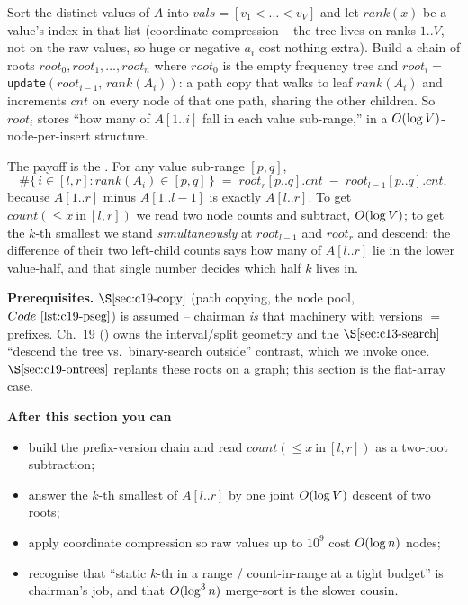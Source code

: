 \begin{topicintro}
Sort the distinct values of \(A\) into \(\mathit{vals}=[v_1<\dots<v_V]\) and let \(\mathit{rank}(x)\) be a value's index in that list (coordinate compression -- the tree lives on ranks \(1..V\), not on the raw values, so huge or negative \(a_i\) cost nothing extra). Build a chain of roots \(\mathit{root}_0,\mathit{root}_1,\dots,\mathit{root}_n\) where \(\mathit{root}_0\) is the empty frequency tree and \(\mathit{root}_i=\) \texttt{update}\((\mathit{root}_{i-1},\,\mathit{rank}(A_i))\): a path copy that walks to leaf \(\mathit{rank}(A_i)\) and increments \(\mathit{cnt}\) on every node of that one path, sharing the other children. So \(\mathit{root}_i\) stores ``how many of \(A[1..i]\) fall in each value sub-range,'' in a \(O(\log V)\)-node-per-insert structure.

The payoff is the . For any value sub-range \([p,q]\),
\[
  \#\{\,i\in[l,r]: \mathit{rank}(A_i)\in[p,q]\,\}
  \;=\; \mathit{root}_r[p..q].\mathit{cnt} \;-\; \mathit{root}_{l-1}[p..q].\mathit{cnt},
\]
because \(A[1..r]\) minus \(A[1..l-1]\) is exactly \(A[l..r]\). To get \(\mathit{count}(\le x\ \text{in}\ [l,r])\) we read two node counts and subtract, \(O(\log V)\); to get the \(k\)-th smallest we stand \emph{simultaneously} at \(\mathit{root}_{l-1}\) and \(\mathit{root}_r\) and descend: the difference of their two left-child counts says how many of \(A[l..r]\) lie in the lower value-half, and that single number decides which half \(k\) lives in.

\textbf{Prerequisites.} \(\secref{c19-copy}\) (path copying, the node pool, \(\coderef{c19-pseg}\)) is assumed -- chairman \emph{is} that machinery with versions \(=\) prefixes. Ch.~19 () owns the interval/split geometry and the \(\secref{c13-search}\) ``descend the tree vs.\ binary-search outside'' contrast, which we invoke once. \(\secref{c19-ontrees}\) replants these roots on a graph; this section is the flat-array case.

\textbf{After this section you can}
\begin{itemize}[nosep]
  \item build the prefix-version chain and read \(\mathit{count}(\le x\ \text{in}\ [l,r])\) as a two-root subtraction; \hfill{}
  \item answer the \(k\)-th smallest of \(A[l..r]\) by one joint \(O(\log V)\) descent of two roots; \hfill{}
  \item apply coordinate compression so raw values up to \(10^9\) cost \(O(\log n)\) nodes; \hfill{}
  \item recognise that ``static \(k\)-th in a range / count-in-range at a tight budget'' is chairman's job, and that \(O(\log^3 n)\) merge-sort is the slower cousin. \hfill{}
\end{itemize}
\end{topicintro}

